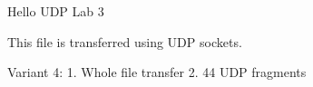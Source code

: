 \documentclass{article}
\begin{document}
Hello UDP Lab 3

This file is transferred using UDP sockets.

Variant 4:
1. Whole file transfer
2. 44 UDP fragments
\end{document}
